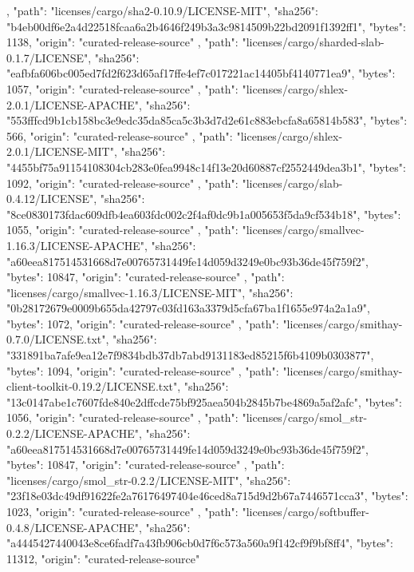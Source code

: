 {{    },
    {
      "path": "licenses/cargo/sha2-0.10.9/LICENSE-MIT",
      "sha256": "b4eb00df6e2a4d22518fcaa6a2b4646f249b3a3c9814509b22bd2091f1392ff1",
      "bytes": 1138,
      "origin": "curated-release-source"
    },
    {
      "path": "licenses/cargo/sharded-slab-0.1.7/LICENSE",
      "sha256": "eafbfa606bc005ed7fd2f623d65af17ffe4ef7c017221ac14405bf4140771ea9",
      "bytes": 1057,
      "origin": "curated-release-source"
    },
    {
      "path": "licenses/cargo/shlex-2.0.1/LICENSE-APACHE",
      "sha256": "553fffcd9b1cb158bc3e9edc35da85ca5c3b3d7d2e61c883ebcfa8a65814b583",
      "bytes": 566,
      "origin": "curated-release-source"
    },
    {
      "path": "licenses/cargo/shlex-2.0.1/LICENSE-MIT",
      "sha256": "4455bf75a91154108304cb283e0fea9948c14f13e20d60887cf2552449dea3b1",
      "bytes": 1092,
      "origin": "curated-release-source"
    },
    {
      "path": "licenses/cargo/slab-0.4.12/LICENSE",
      "sha256": "8ce0830173fdac609dfb4ea603fdc002c2f4af0dc9b1a005653f5da9cf534b18",
      "bytes": 1055,
      "origin": "curated-release-source"
    },
    {
      "path": "licenses/cargo/smallvec-1.16.3/LICENSE-APACHE",
      "sha256": "a60eea817514531668d7e00765731449fe14d059d3249e0bc93b36de45f759f2",
      "bytes": 10847,
      "origin": "curated-release-source"
    },
    {
      "path": "licenses/cargo/smallvec-1.16.3/LICENSE-MIT",
      "sha256": "0b28172679e0009b655da42797c03fd163a3379d5cfa67ba1f1655e974a2a1a9",
      "bytes": 1072,
      "origin": "curated-release-source"
    },
    {
      "path": "licenses/cargo/smithay-0.7.0/LICENSE.txt",
      "sha256": "331891ba7afe9ea12e7f9834bdb37db7abd9131183ed85215f6b4109b0303877",
      "bytes": 1094,
      "origin": "curated-release-source"
    },
    {
      "path": "licenses/cargo/smithay-client-toolkit-0.19.2/LICENSE.txt",
      "sha256": "13c0147abe1c7607fde840e2dffcde75bf925aea504b2845b7be4869a5af2afc",
      "bytes": 1056,
      "origin": "curated-release-source"
    },
    {
      "path": "licenses/cargo/smol_str-0.2.2/LICENSE-APACHE",
      "sha256": "a60eea817514531668d7e00765731449fe14d059d3249e0bc93b36de45f759f2",
      "bytes": 10847,
      "origin": "curated-release-source"
    },
    {
      "path": "licenses/cargo/smol_str-0.2.2/LICENSE-MIT",
      "sha256": "23f18e03dc49df91622fe2a76176497404e46ced8a715d9d2b67a7446571cca3",
      "bytes": 1023,
      "origin": "curated-release-source"
    },
    {
      "path": "licenses/cargo/softbuffer-0.4.8/LICENSE-APACHE",
      "sha256": "a4445427440043e8ce6fadf7a43fb906cb0d7f6c573a560a9f142cf9f9bf8ff4",
      "bytes": 11312,
      "origin": "curated-release-source"
}}
